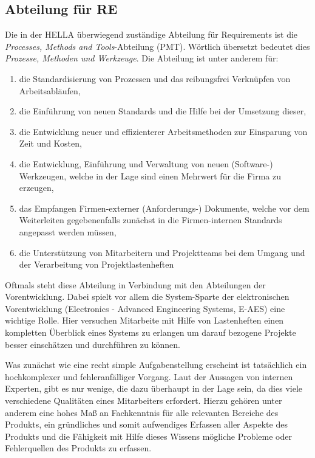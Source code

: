 \documentclass[12pt]{report}
\begin{document}
\subsection{Abteilung für RE}
Die in der HELLA überwiegend zuständige Abteilung für Requirements ist die \textit{Processes, Methods and Tools}-Abteilung (PMT). Wörtlich übersetzt bedeutet dies \textit{Prozesse, Methoden und Werkzeuge}. Die Abteilung ist unter anderem für: 
\begin{enumerate}
\item die Standardisierung von Prozessen und das reibungsfrei Verknüpfen von Arbeitsabläufen,
\item die Einführung von neuen Standards und die Hilfe bei der Umsetzung dieser,
\item die Entwicklung neuer und effizienterer Arbeitsmethoden zur Einsparung von Zeit und Kosten,
\item die Entwicklung, Einführung und Verwaltung von neuen (Software-) Werkzeugen, welche in der Lage sind einen Mehrwert für die Firma zu erzeugen,
\item das Empfangen Firmen-externer (Anforderungs-) Dokumente, welche vor dem Weiterleiten gegebenenfalls zunächst in die Firmen-internen Standards angepasst werden müssen, 
\item die Unterstützung von Mitarbeitern und Projektteams bei dem Umgang und der Verarbeitung von Projektlastenheften
\end{enumerate}

Oftmals steht diese Abteilung in Verbindung mit den Abteilungen der Vorentwicklung. Dabei spielt vor allem die System-Sparte der elektronischen Vorentwicklung (Electronics - Advanced Engineering Systems, E-AES) eine wichtige Rolle. Hier versuchen Mitarbeite mit Hilfe von Lastenheften einen kompletten Überblick eines Systems zu erlangen um darauf bezogene Projekte besser einschätzen und durchführen zu können. 

Was zunächst wie eine recht simple Aufgabenstellung erscheint ist tatsächlich ein hochkomplexer und fehleranfälliger Vorgang. Laut der Aussagen von internen Experten, gibt es nur wenige, die dazu überhaupt in der Lage sein, da dies viele verschiedene Qualitäten eines Mitarbeiters erfordert. Hierzu gehören unter anderem eine hohes Maß an Fachkenntnis für alle relevanten Bereiche des Produkts, ein gründliches und somit aufwendiges Erfassen aller Aspekte des Produkts und die Fähigkeit mit Hilfe dieses Wissens mögliche Probleme oder Fehlerquellen des Produkts zu erfassen. 
\end{document}
